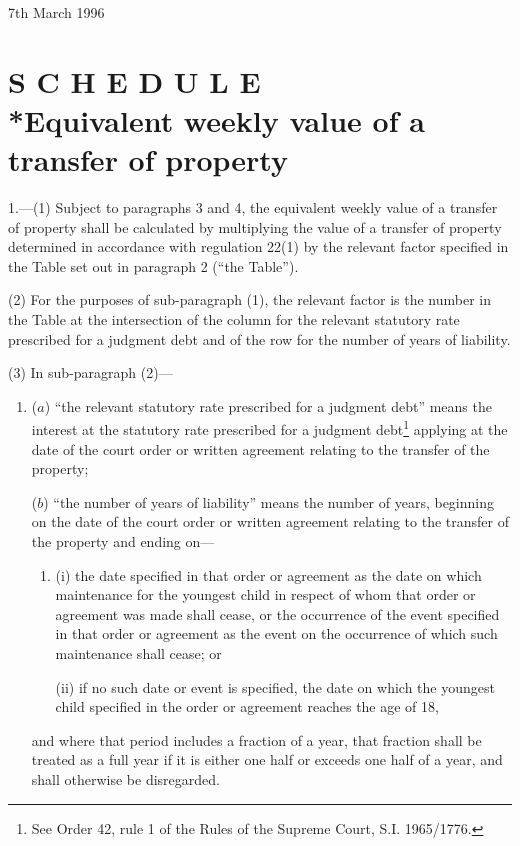 \documentclass[a4paper]{article}
\newcommand{\parthead}{}
\begin{document}
7th March 1996

\clearpage

\part[Schedule --- Equivalent weekly value of a transfer of property]{S C H E D U L E\\*Equivalent weekly value of a transfer of property}

\renewcommand\parthead{--- Schedule}

1.—(1) Subject to paragraphs 3 and 4, the equivalent weekly value of a transfer of property shall be calculated by multiplying the value of a transfer of property determined in accordance with regulation 22(1) by the relevant factor specified in the Table set out in paragraph 2 (“the Table”).

(2) For the purposes of sub-paragraph (1), the relevant factor is the number in the Table at the intersection of the column for the relevant statutory rate prescribed for a judgment debt and of the row for the number of years of liability.

(3) In sub-paragraph (2)—
\begin{enumerate}\item[]
($a$) “the relevant statutory rate prescribed for a judgment debt” means the interest at the statutory rate prescribed for a judgment debt\footnote{\frenchspacing See Order 42, rule 1 of the Rules of the Supreme Court, S.I. 1965/1776.} applying at the date of the court order or written agreement relating to the transfer of the property;

($b$) “the number of years of liability” means the number of years, beginning on the date of the court order or written agreement relating to the transfer of the property and ending on—
\begin{enumerate}\item[]
(i) the date specified in that order or agreement as the date on which maintenance for the youngest child in respect of whom that order or agreement was made shall cease, or the occurrence of the event specified in that order or agreement as the event on the occurrence of which such maintenance shall cease; or

(ii) if no such date or event is specified, the date on which the youngest child specified in the order or agreement reaches the age of 18,
\end{enumerate}
and where that period includes a fraction of a year, that fraction shall be treated as a full year if it is either one half or exceeds one half of a year, and shall otherwise be disregarded.
\end{enumerate}
\end{document}
